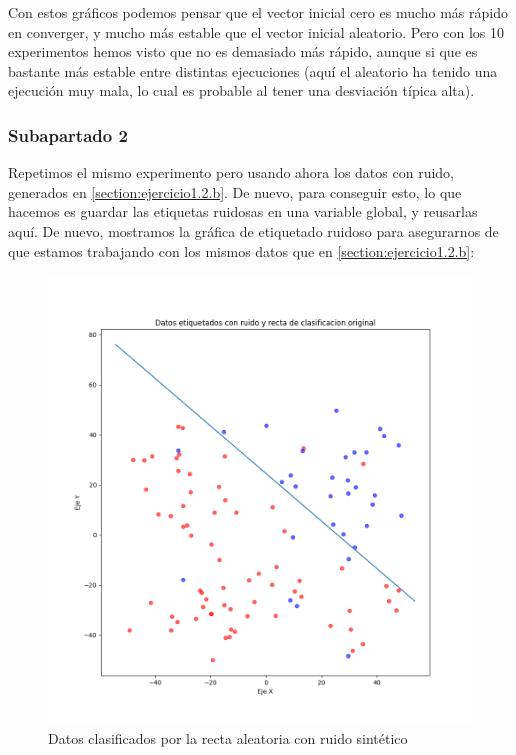 \documentclass[11pt]{article}
\begin{document}
Con estos gráficos podemos pensar que el vector inicial cero es mucho más rápido en converger, y mucho más estable que el vector inicial aleatorio. Pero con los 10 experimentos hemos visto que no es demasiado más rápido, aunque si que es bastante más estable entre distintas ejecuciones (aquí el aleatorio ha tenido una ejecución muy mala, lo cual es probable al tener una desviación típica alta).



\subsubsection{Subapartado 2}

Repetimos el mismo experimento pero usando ahora los datos con ruido, generados en \ref{section:ejercicio1.2.b}. De nuevo, para conseguir esto, lo que hacemos es guardar las etiquetas ruidosas en una variable global, y reusarlas aquí. De nuevo, mostramos la gráfica de etiquetado ruidoso para asegurarnos de que estamos trabajando con los mismos datos que en \ref{section:ejercicio1.2.b}:

\begin{figure}[H]
    \centering
    \includegraphics[scale=0.3]{puntos_clasificados_recta_aleatorizados02}
    \caption{Datos clasificados por la recta aleatoria con ruido sintético}
\end{figure}
\end{document}
